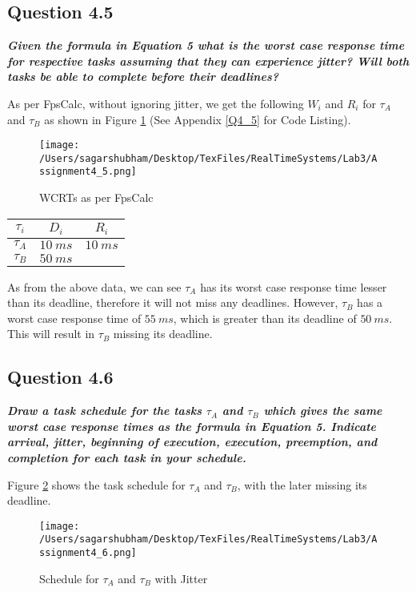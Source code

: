 \documentclass[oneside,a4paper]{article}
\begin{document}
\subsection*{\normalsize{Question 4.5}}
\textit{\textbf{Given the formula in Equation 5 what is the worst case response time for respective tasks assuming that they can experience jitter? Will both tasks be able to complete before their deadlines?}}\par
As per FpsCalc, without ignoring jitter, we get the following $W_i$ and $R_i$ for $\tau_A$ and $\tau_B$ as shown in Figure \ref{fig4_5} (See Appendix \ref{Q4_5} for Code Listing).
\begin{center}
\begin{figure}[H]
                    \centering
                    \texttt{[image: /Users/sagarshubham/Desktop/TexFiles/RealTimeSystems/Lab3/Assignment4\_5.png]}
                    \caption[Figure for Question 4.5]{WCRTs as per FpsCalc}
                    \label{fig4_5}        
\end{figure}
\begin{tabular}{| c | c | c |}
\hline
\textbf{$\tau_i$} & \textbf{$D_i$} & \textbf{$R_i$} \\
\hline
$\tau_A$ & $10\ ms$ & $10\ ms$ \\
$\tau_B$ & $50 \ ms$ & \color{red}{$55\ ms$} \\
\hline
\end{tabular}
\end{center}\par
As from the above data, we can see $\tau_A$ has its worst case response time lesser than its deadline, therefore it will not miss any deadlines. However, $\tau_B$ has a worst case response time of $55\ ms$, which is greater than its deadline of $50\ ms$. This will result in $\tau_B$ missing its deadline.\par
\pagebreak
\subsection*{\normalsize{Question 4.6}}
\textit{\textbf{Draw a task schedule for the tasks $\tau_A$ and $\tau_B$ which gives the same worst case response times as the formula in Equation 5. Indicate arrival, jitter, beginning of execution, execution, preemption, and completion for each task in your schedule.}}\par
Figure \ref{fig4_6} shows the task schedule for $\tau_A$ and $\tau_B$, with the later missing its deadline.
\begin{center}
\begin{figure}[H]
                    \centering
                    \texttt{[image: /Users/sagarshubham/Desktop/TexFiles/RealTimeSystems/Lab3/Assignment4\_6.png]}
                    \caption[Figure for Question 4.6]{Schedule for $\tau_A$ and $\tau_B$ with Jitter}
                    \label{fig4_6}        
\end{figure}
\end{center}
\pagebreak
\end{document}
